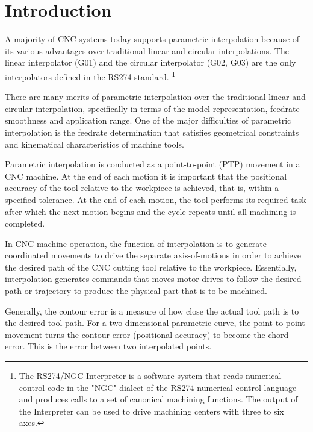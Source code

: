 \justifying
\noindent

\section{Introduction}

A majority of CNC systems today supports parametric interpolation because of its various advantages over traditional linear and circular  interpolations. The linear interpolator (G01) and the circular interpolator (G02, G03) are the only interpolators defined in the RS274 standard. \footnote{The RS274/NGC Interpreter is a software system that reads numerical control code in the "NGC" dialect of the RS274 numerical control language and produces calls to a set of canonical machining functions. The output of the Interpreter can be used to drive machining centers with three to six axes.}
\vspace*{1\baselineskip}

There are many merits of parametric interpolation over the traditional linear and circular interpolation, specifically in terms of the model representation, feedrate smoothness and application range. One of the major difficulties of parametric interpolation is the feedrate determination that satisfies geometrical constraints and kinematical characteristics of machine tools. 
\vspace*{1\baselineskip}

Parametric interpolation is conducted as a point-to-point (PTP) movement in a CNC machine. At the end of each motion it is important that the positional accuracy of the tool relative to the workpiece is achieved, that is, within a specified tolerance. At the end of each motion, the tool performs its required task after which the next motion begins and the cycle repeats until all machining is completed. 
\vspace*{1\baselineskip}

In CNC machine operation, the function of interpolation is to generate coordinated movements to drive the separate axis-of-motions in order to achieve the desired path of the CNC cutting tool relative to the workpiece. Essentially, interpolation generates commands that moves motor drives to follow the desired path or trajectory to produce the physical part that is to be machined. 
\vspace*{1\baselineskip}

Generally, the contour error is a measure of how close the actual tool path is to the desired tool path. For a two-dimensional parametric curve, the point-to-point movement turns the contour error (positional accuracy) to become the chord-error. This is the error between two interpolated points.
\vspace*{1\baselineskip}





